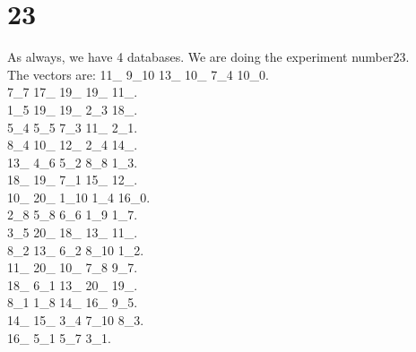 \chapter{23}
\indent As always, we have 4 databases. We are doing the experiment number23.\\
The vectors are:
11\_ 9\_10 13\_ 10\_ 7\_4 10\_0.\\7\_7 17\_ 19\_ 19\_ 11\_.\\1\_5 19\_ 19\_ 2\_3 18\_.\\5\_4 5\_5 7\_3 11\_ 2\_1.\\8\_4 10\_ 12\_ 2\_4 14\_.\\13\_ 4\_6 5\_2 8\_8 1\_3.\\18\_ 19\_ 7\_1 15\_ 12\_.\\10\_ 20\_ 1\_10 1\_4 16\_0.\\2\_8 5\_8 6\_6 1\_9 1\_7.\\3\_5 20\_ 18\_ 13\_ 11\_.\\8\_2 13\_ 6\_2 8\_10 1\_2.\\11\_ 20\_ 10\_ 7\_8 9\_7.\\18\_ 6\_1 13\_ 20\_ 19\_.\\8\_1 1\_8 14\_ 16\_ 9\_5.\\14\_ 15\_ 3\_4 7\_10 8\_3.\\16\_ 5\_1 5\_7 3\_1.\\